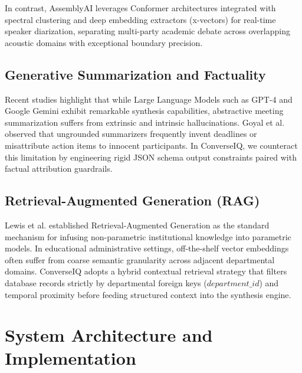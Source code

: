 \documentclass[conference]{IEEEtran}
\begin{document}
In contrast, AssemblyAI leverages Conformer architectures \cite{conformer} integrated with spectral clustering and deep embedding extractors (x-vectors) for real-time speaker diarization, separating multi-party academic debate across overlapping acoustic domains with exceptional boundary precision.

\subsection{Generative Summarization and Factuality}
Recent studies highlight that while Large Language Models such as GPT-4 \cite{gpt4} and Google Gemini \cite{gemini} exhibit remarkable synthesis capabilities, abstractive meeting summarization suffers from extrinsic and intrinsic hallucinations. Goyal et al. \cite{factual_eval} observed that ungrounded summarizers frequently invent deadlines or misattribute action items to innocent participants. In ConverseIQ, we counteract this limitation by engineering rigid JSON schema output constraints paired with factual attribution guardrails.

\subsection{Retrieval-Augmented Generation (RAG)}
Lewis et al. \cite{rag} established Retrieval-Augmented Generation as the standard mechanism for infusing non-parametric institutional knowledge into parametric models. In educational administrative settings, off-the-shelf vector embeddings often suffer from coarse semantic granularity across adjacent departmental domains. ConverseIQ adopts a hybrid contextual retrieval strategy that filters database records strictly by departmental foreign keys ($department\_id$) and temporal proximity before feeding structured context into the synthesis engine.

\section{System Architecture and Implementation}
\end{document}
